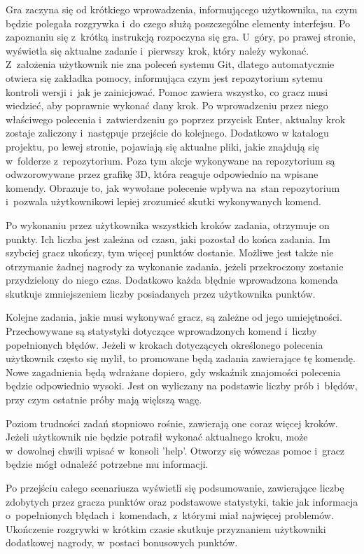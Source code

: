 \documentclass[12pt,a4paper,polish,thesis]{dcsbook}
\begin{document}
{	Gra zaczyna się od krótkiego wprowadzenia, informującego użytkownika, na czym będzie polegała rozgrywka i~do czego służą poszczególne elementy interfejsu. Po zapoznaniu się z~krótką instrukcją rozpoczyna się gra. U~góry, po prawej stronie, wyświetla się aktualne zadanie i~pierwszy krok, który należy wykonać. Z~założenia użytkownik nie zna poleceń systemu Git, dlatego automatycznie otwiera się zakładka pomocy, informująca czym jest repozytorium sytemu kontroli wersji i~jak je zainicjować. Pomoc zawiera wszystko, co gracz musi wiedzieć, aby poprawnie wykonać dany krok. Po wprowadzeniu przez niego właściwego polecenia i~zatwierdzeniu go poprzez przycisk Enter, aktualny krok zostaje zaliczony i~następuje przejście do kolejnego. Dodatkowo w katalogu projektu, po lewej stronie, pojawiają się aktualne pliki, jakie znajdują się w~folderze z~repozytorium. Poza tym akcje wykonywane na repozytorium są odwzorowywane przez grafikę 3D, która reaguje odpowiednio na wpisane komendy. Obrazuje to, jak wywołane polecenie wpływa na~stan repozytorium i~pozwala użytkownikowi lepiej zrozumieć skutki wykonywanych komend.

	Po wykonaniu przez użytkownika wszystkich kroków zadania, otrzymuje on punkty. Ich liczba jest zależna od czasu, jaki pozostał do końca zadania. Im szybciej gracz ukończy, tym więcej punktów dostanie. Możliwe jest także nie otrzymanie żadnej nagrody za wykonanie zadania, jeżeli przekroczony zostanie przydzielony do niego czas. Dodatkowo każda błędnie wprowadzona komenda skutkuje zmniejszeniem liczby posiadanych przez użytkownika punktów.
	
	Kolejne zadania, jakie musi wykonywać gracz, są zależne od jego umiejętności. Przechowywane są statystyki dotyczące wprowadzonych komend i~liczby popełnionych błędów. Jeżeli w krokach dotyczących określonego polecenia użytkownik często się mylił, to promowane będą zadania zawierające tę komendę. Nowe zagadnienia będą wdrażane dopiero, gdy wskaźnik znajomości polecenia będzie odpowiednio wysoki. Jest on wyliczany na podstawie liczby prób i~błędów, przy czym ostatnie próby mają większą wagę.
	
	Poziom trudności zadań stopniowo rośnie, zawierają one coraz więcej kroków. Jeżeli użytkownik nie będzie potrafił wykonać aktualnego kroku, może w~dowolnej chwili wpisać w~konsoli 'help'. Otworzy się wówczas pomoc i~gracz będzie mógł odnaleźć potrzebne mu informacji.

	Po przejściu całego scenariusza wyświetli się podsumowanie, zawierające liczbę zdobytych przez gracza punktów oraz podstawowe statystyki, takie jak informacja o~popełnionych błędach i~komendach, z~którymi miał najwięcej problemów. Ukończenie rozgrywki w krótkim czasie skutkuje przyznaniem użytkowniki dodatkowej nagrody, w~postaci bonusowych punktów.
	
}
\end{document}
